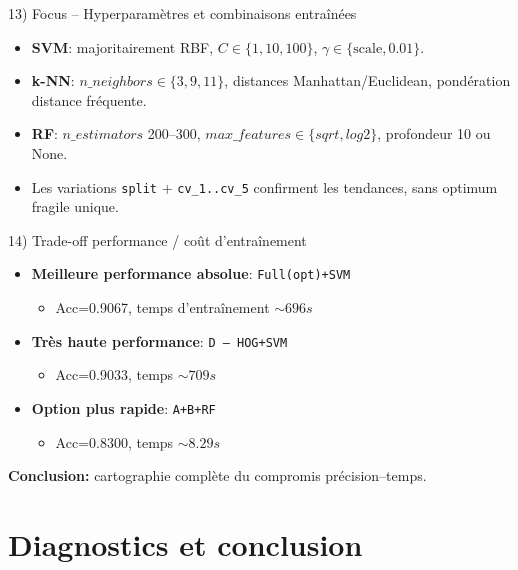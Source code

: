 \documentclass[aspectratio=169]{beamer}
\begin{document}
\begin{frame}{13) Focus -- Hyperparamètres et combinaisons entraînées}
\small
\begin{itemize}
  \item \textbf{SVM}: majoritairement RBF, \(C \in \{1,10,100\}\), \(\gamma \in \{\text{scale}, 0.01\}\).
  \item \textbf{k-NN}: \(n\_neighbors \in \{3,9,11\}\), distances Manhattan/Euclidean, pondération distance fréquente.
  \item \textbf{RF}: \(n\_estimators\) 200--300, \(max\_features \in \{sqrt,log2\}\), profondeur 10 ou None.
  \item Les variations \texttt{split} + \texttt{cv\_1..cv\_5} confirment les tendances, sans optimum fragile unique.
\end{itemize}
\end{frame}

\begin{frame}{14) Trade-off performance / coût d'entraînement}
\begin{itemize}
  \item \textbf{Meilleure performance absolue}: \texttt{Full(opt)+SVM}
  \begin{itemize}
    \item Acc=0.9067, temps d'entraînement \(\sim 696s\)
  \end{itemize}
  \item \textbf{Très haute performance}: \texttt{D -- HOG+SVM}
  \begin{itemize}
    \item Acc=0.9033, temps \(\sim 709s\)
  \end{itemize}
  \item \textbf{Option plus rapide}: \texttt{A+B+RF}
  \begin{itemize}
    \item Acc=0.8300, temps \(\sim 8.29s\)
  \end{itemize}
\end{itemize}
\textbf{Conclusion:} cartographie complète du compromis précision--temps.
\end{frame}

\section{Diagnostics et conclusion}
\end{document}
